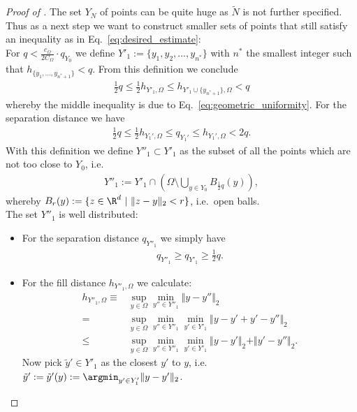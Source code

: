 \documentclass[a4paper, 10pt]{article}
\begin{document}
\begin{proof}[Proof of ]
The set $Y_N$ of points can be quite huge as $\tilde{N}$ is not further specified.
Thus as a next step we want to construct smaller sets of points that still satisfy an inequality as in Eq.\ \eqref{eq:desired_estimate}: \\
For $q < \frac{c_\Omega}{2 C_\Omega} \cdot q_{Y_0}$ we define $Y'_1 := \{ y_1, y_2, ..., y_{n^*}\}$ with $n^*$ the smallest integer such that $h_{\{y_1, ..., y_{n^* + 1}\}} < q$.
From this definition we conclude
\begin{align}
\label{eq:proof:geom_props_1}
\frac{1}{2} q \leq \frac{1}{2} h_{Y'_1, \Omega} \leq h_{Y'_1 \cup \{ y_{n^*+1} \}, \Omega} < q
\end{align}
whereby the middle inequality is due to Eq.\ \eqref{eq:geometric_uniformity}.
For the separation distance we have
\begin{align}
\label{eq:proof:geom_props_2}
\frac{1}{2} q \leq \frac{1}{2} h_{Y_1', \Omega} \leq q_{Y_1'} \leq h_{Y_1', \Omega} < 2q.
\end{align}
With this definition we define $Y''_1 \subset Y'_1$ as the subset of all the points which are not too close to $Y_0$, i.e.\
\begin{align}
\label{eq:definition_y''}
Y''_1 := Y'_1 \cap \left( \Omega \setminus \bigcup_{y \in Y_0} B_{\frac{1}{2} q}(y) \right),
\end{align}
whereby $B_r(y) := \{ z \in \R^d ~ | ~ \Vert z - y \Vert_2 < r \}$, i.e.\ open balls. \\
The set $Y''_1$ is well distributed:
\begin{itemize}
\item For the separation distance $q_{Y''_1}$ we simply have 
\begin{align*}
q_{Y''_1} \geq q_{Y'_1} \geq \frac{1}{2} q.
\end{align*}
\item For the fill distance $h_{Y''_1, \Omega}$ we calculate:
\begin{align*}
h_{Y''_1, \Omega} \equiv& \sup_{y \in \Omega} \min_{y'' \in Y''_1} \Vert y - y'' \Vert_2 \\
=& \sup_{y \in \Omega} \min_{y'' \in Y''_1} \min_{y' \in Y'_1} \Vert y - y' + y' - y'' \Vert_2 \\
\leq& \sup_{y \in \Omega} \min_{y'' \in Y''_1} \min_{y' \in Y'_1} \Vert y - y' \Vert_2 + \Vert y' - y'' \Vert_2.
\end{align*}
Now pick $\tilde{y}' \in Y'_1$ as the closest $y'$ to $y$, i.e.\ $\tilde{y}' := \tilde{y}'(y) := \argmin_{y' \in Y'_1} \Vert y - y' \Vert_2$.

\end{itemize}
\end{proof}
\end{document}
